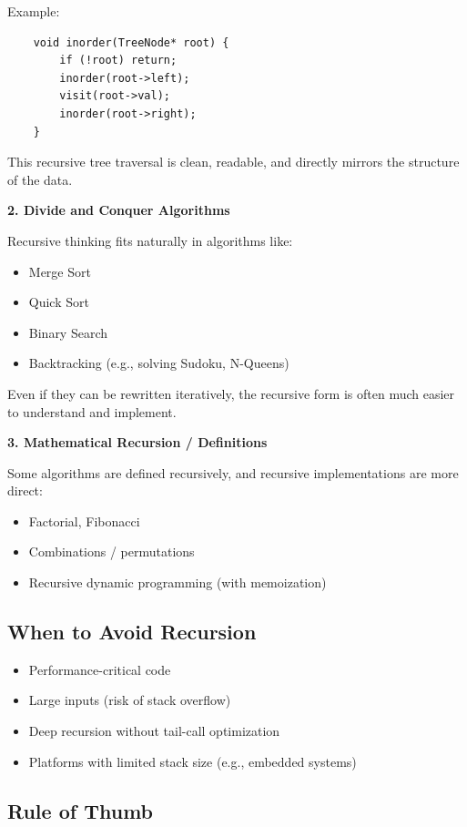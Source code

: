 \documentclass[a4paper,11pt,twoside]{book}
\begin{document}
\noindent Example:
\begin{verbatim}
	void inorder(TreeNode* root) {
		if (!root) return;
		inorder(root->left);
		visit(root->val);
		inorder(root->right);
	}
\end{verbatim}

This recursive tree traversal is clean, readable, and directly mirrors the structure of the data.

\textbf{2. Divide and Conquer Algorithms}

Recursive thinking fits naturally in algorithms like:

\begin{itemize}
	\item Merge Sort
	\item Quick Sort
	\item Binary Search
	\item Backtracking (e.g., solving Sudoku, N-Queens)
\end{itemize}

Even if they can be rewritten iteratively, the recursive form is often much easier to understand and implement.

\textbf{3. Mathematical Recursion / Definitions}

Some algorithms are defined recursively, and recursive implementations are more direct:

\begin{itemize}
	\item Factorial, Fibonacci
	\item Combinations / permutations
	\item Recursive dynamic programming (with memoization)
\end{itemize}


\subsection{When to Avoid Recursion}

\begin{itemize}
	\item Performance-critical code
	\item Large inputs (risk of stack overflow)
	\item Deep recursion without tail-call optimization
	\item Platforms with limited stack size (e.g., embedded systems)
\end{itemize}

\subsection{Rule of Thumb}
\end{document}
